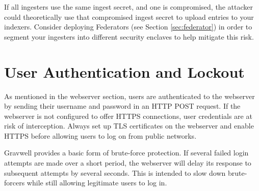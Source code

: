 If all ingesters use the same ingest secret, and one is compromised, the attacker
could theoretically use that compromised ingest secret to upload entries to
your indexers. Consider deploying Federators (see Section \ref{sec:federator}) in
order to segment your ingesters into different security enclaves to help mitigate this risk.

\section{User Authentication and Lockout}
As mentioned in the webserver section, users are authenticated to the
webserver by sending their username and password in an HTTP POST
request. If the webserver is not configured to offer HTTPS connections,
user credentials are at risk of interception. Always set up TLS
certificates on the webserver and enable HTTPS before allowing users to
log on from public networks.

Gravwell provides a basic form of brute-force protection. If several
failed login attempts are made over a short period, the webserver will
delay its response to subsequent attempts by several seconds. This is
intended to slow down brute-forcers while still allowing legitimate
users to log in.
